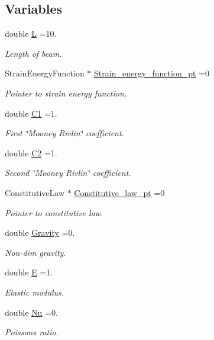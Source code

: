 \subsection*{Variables}
\begin{DoxyCompactItemize}
\item 
double \hyperlink{namespaceGlobal__Physical__Variables_a1b8bfc451f6b7ac89eca18f04338f47f}{L} =10.
\begin{DoxyCompactList}\small\item\em Length of beam. \end{DoxyCompactList}\item 
Strain\+Energy\+Function $\ast$ \hyperlink{namespaceGlobal__Physical__Variables_a73135f793690b4386bf83bbefc7bf310}{Strain\+\_\+energy\+\_\+function\+\_\+pt} =0
\begin{DoxyCompactList}\small\item\em Pointer to strain energy function. \end{DoxyCompactList}\item 
double \hyperlink{namespaceGlobal__Physical__Variables_a849754fa7155c1a31481674ce4845658}{C1} =1.
\begin{DoxyCompactList}\small\item\em First \char`\"{}\+Mooney Rivlin\char`\"{} coefficient. \end{DoxyCompactList}\item 
double \hyperlink{namespaceGlobal__Physical__Variables_af9defd1b5745cce50d2c386b3ac0e0ae}{C2} =1.
\begin{DoxyCompactList}\small\item\em Second \char`\"{}\+Mooney Rivlin\char`\"{} coefficient. \end{DoxyCompactList}\item 
Constitutive\+Law $\ast$ \hyperlink{namespaceGlobal__Physical__Variables_a2a37fb040c832ee7a086bb13bb02a100}{Constitutive\+\_\+law\+\_\+pt} =0
\begin{DoxyCompactList}\small\item\em Pointer to constitutive law. \end{DoxyCompactList}\item 
double \hyperlink{namespaceGlobal__Physical__Variables_a8b80d3e8d63b8d0a0ed435a2dd7fe2ad}{Gravity} =0.
\begin{DoxyCompactList}\small\item\em Non-\/dim gravity. \end{DoxyCompactList}\item 
double \hyperlink{namespaceGlobal__Physical__Variables_a09a019474b7405b35da2437f7779bc7e}{E} =1.
\begin{DoxyCompactList}\small\item\em Elastic modulus. \end{DoxyCompactList}\item 
double \hyperlink{namespaceGlobal__Physical__Variables_a3962c36313826b19f216f6bbbdd6a477}{Nu} =0.
\begin{DoxyCompactList}\small\item\em Poisson\textquotesingle{}s ratio. \end{DoxyCompactList}\end{DoxyCompactItemize}


